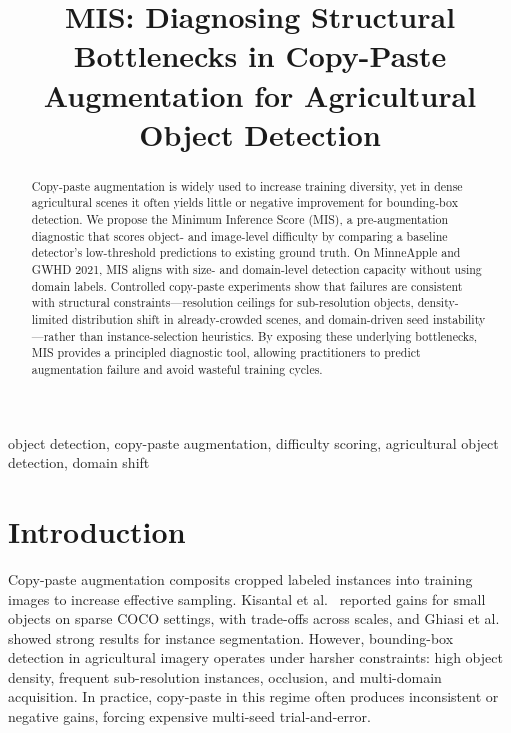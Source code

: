 \documentclass[conference]{IEEEtran}
\begin{document}
\title{MIS: Diagnosing Structural Bottlenecks in Copy-Paste Augmentation for Agricultural Object Detection}

\author{
}

\maketitle

\begin{abstract}
Copy-paste augmentation is widely used to increase training diversity, 
yet in dense agricultural scenes it often yields little or negative improvement for bounding-box detection.
We propose the Minimum Inference Score (MIS), a pre-augmentation diagnostic that scores object- and image-level difficulty by comparing a baseline detector's low-threshold predictions to existing ground truth.
On MinneApple and GWHD 2021, MIS aligns with size- and domain-level detection capacity without using domain labels.
Controlled copy-paste experiments show that failures are consistent with structural constraints---resolution ceilings for sub-resolution objects, density-limited distribution shift in already-crowded scenes, and domain-driven seed instability---rather than instance-selection heuristics.
By exposing these underlying bottlenecks, MIS provides a principled diagnostic tool, 
allowing practitioners to predict augmentation failure and avoid wasteful training cycles.

\end{abstract}

\begin{IEEEkeywords}
object detection, copy-paste augmentation, difficulty scoring, agricultural object detection, domain shift
\end{IEEEkeywords}

\section{Introduction}
Copy-paste augmentation \cite{kisantal2019augmentation, ghiasi2021simple} composits cropped labeled instances into training images to increase effective sampling.
Kisantal et al.\ \cite{kisantal2019augmentation} reported gains for small objects on sparse COCO settings, with trade-offs across scales, and Ghiasi et al.\ \cite{ghiasi2021simple} showed strong results for instance segmentation.
However, bounding-box detection in agricultural imagery operates under harsher constraints: high object density, frequent sub-resolution instances, occlusion, and multi-domain acquisition.
In practice, copy-paste in this regime often produces inconsistent or negative gains, forcing expensive multi-seed trial-and-error.
\end{document}

